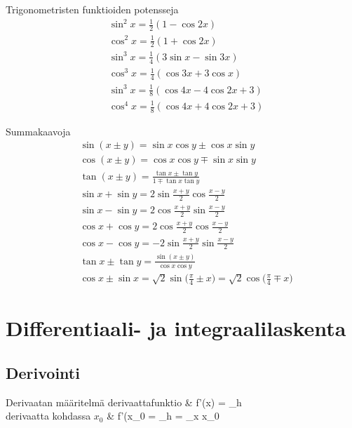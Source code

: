 Trigonometristen funktioiden potensseja \cite[s. 33]{MAOL}
\begin{align*}
& \sin^2 x = \frac{1}{2} (1- \cos 2x) \\
& \cos^2 x = \frac{1}{2} (1+ \cos 2x) \\
& \sin^3 x = \frac{1}{4} (3 \sin x - \sin 3x) \\
& \cos^3 x = \frac{1}{4} (\cos 3x + 3 \cos x) \\
& \sin^3 x = \frac{1}{8} (\cos 4x - 4 \cos 2x + 3) \\
& \cos^4 x = \frac{1}{8} (\cos 4x + 4 \cos 2x + 3)
\end{align*}

Summakaavoja \cite[s. 33]{MAOL}
\begin{align*}
& \sin ( x \pm y ) = \sin x \cos y \pm \cos x \sin y \\
& \cos (x \pm y ) = \cos x \cos y \mp \sin x \sin y \\
& \tan (x \pm y ) = \frac{\tan x \pm \tan y}{1 \mp \tan x \tan y} \\
& \sin x + \sin y = 2 \sin \frac{x+y}{2} \cos \frac{x-y}{2} \\
& \sin x - \sin y = 2 \cos \frac{x+y}{2} \sin \frac{x-y}{2} \\
& \cos x + \cos y = 2 \cos \frac{x+y}{2} \cos \frac{x-y}{2} \\
& \cos x - \cos y = -2 \sin \frac{x+y}{2} \sin \frac{x-y}{2} \\
& \tan x \pm \tan y = \frac{\sin(x \pm y)}{\cos x \cos y} \\
& \cos x \pm \sin x = \sqrt{2} \sin \Big( \frac{\pi}{4} \pm x \Big) = \sqrt{2} \cos \Big( \frac{\pi}{4} \mp x \Big) 
\end{align*}

\section{Differentiaali- ja integraalilaskenta}

\subsection{Derivointi}

\begin{eqtable-full}{Derivaatan määritelmä \cite[s. 41]{MAOL} }
derivaattafunktio			& f'(x) = \lim_{h }  \\
derivaatta kohdassa $x_0$	& f'(x_0 = \lim_{h }  = \lim_{x \rightarrow x_0}  \\
\end{eqtable-full}


